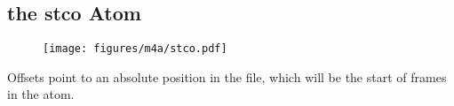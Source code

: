 
\clearpage

\subsection{the stco Atom}
\begin{figure}[h]
  \texttt{[image: figures/m4a/stco.pdf]}
\end{figure}
\par
\noindent
Offsets point to an absolute position in the file,
which will be the start of frames in the  atom.
